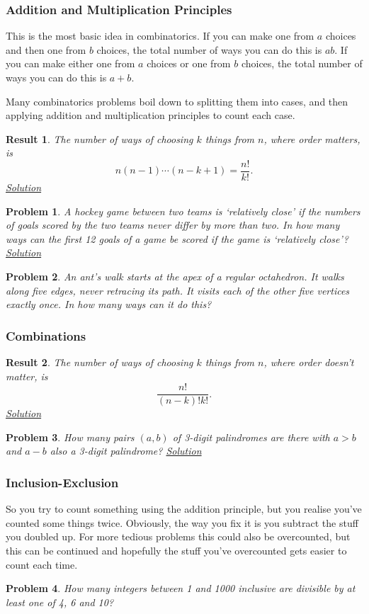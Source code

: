 \documentclass{amsart}
\newtheorem{problem}{Problem}[subsubsection]
\newtheorem{result}{Result}[subsubsection]
\begin{document}
\subsubsection{Addition and Multiplication Principles}
This is the most basic idea in combinatorics. If you can make one from $a$
choices and then one from $b$ choices, the total number of ways you can do this
is $ab$. If you can make either one from $a$ choices or one from $b$ choices,
the total number of ways you can do this is $a+b$.

Many combinatorics problems boil down to splitting them into cases, and
then applying addition and multiplication principles to count each case.
\begin{result}\label{r:b:c:am:1}
  The number of ways of choosing $k$ things from $n$, where order matters, is
  \[n(n-1)\cdots(n-k+1)=\frac{n!}{k!}.\]
  \hyperlink{sr:b:c:am:1}{Solution}
\end{result}
\begin{problem}\label{p:b:c:am:1}
  A hockey game between two teams is `relatively close' if the numbers of goals
  scored by the two teams never differ by more than two. In how many ways can
  the first 12 goals of a game be scored if the game is `relatively close'?
  \hyperlink{sp:b:c:am:1}{Solution}
\end{problem}
\begin{problem}\label{p:b:c:am:2}
  An ant's walk starts at the apex of a regular octahedron. It walks along five
  edges, never retracing its path. It visits each of the other five vertices
  exactly once. In how many ways can it do this?
\end{problem}
\subsubsection{Combinations}
\begin{result}\label{r:b:c:c:1}
  The number of ways of choosing $k$ things from $n$, where order doesn't
  matter, is \[\frac{n!}{(n-k)!k!}.\]
  \hyperlink{sr:b:c:c:1}{Solution}
\end{result}
\begin{problem}{\label{p:b:c:c:1}}
  How many pairs $(a,b)$ of 3-digit palindromes are there with $a>b$ and
  $a-b$ also a 3-digit palindrome?
  \hyperlink{sp:b:c:c:1}{Solution}
\end{problem}
\subsubsection{Inclusion-Exclusion}
So you try to count something using the addition principle, but you realise
you've counted some things twice. Obviously, the way you fix it is you subtract
the stuff you doubled up. For more tedious problems this could also be
overcounted, but this can be continued and hopefully the stuff you've
overcounted gets easier to count each time.
\begin{problem}{\label{p:b:c:pie:1}}
  How many integers between 1 and 1000 inclusive are divisible by at least one
  of 4, 6 and 10?
\end{problem}
\end{document}
